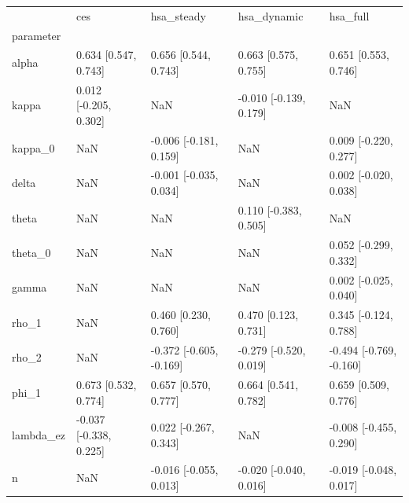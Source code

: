 \begin{tabular}{lllll}
\toprule
 & ces & hsa\_steady & hsa\_dynamic & hsa\_full \\
parameter &  &  &  &  \\
\midrule
alpha & 0.634 [0.547, 0.743] & 0.656 [0.544, 0.743] & 0.663 [0.575, 0.755] & 0.651 [0.553, 0.746] \\
kappa & 0.012 [-0.205, 0.302] & NaN & -0.010 [-0.139, 0.179] & NaN \\
kappa\_0 & NaN & -0.006 [-0.181, 0.159] & NaN & 0.009 [-0.220, 0.277] \\
delta & NaN & -0.001 [-0.035, 0.034] & NaN & 0.002 [-0.020, 0.038] \\
theta & NaN & NaN & 0.110 [-0.383, 0.505] & NaN \\
theta\_0 & NaN & NaN & NaN & 0.052 [-0.299, 0.332] \\
gamma & NaN & NaN & NaN & 0.002 [-0.025, 0.040] \\
rho\_1 & NaN & 0.460 [0.230, 0.760] & 0.470 [0.123, 0.731] & 0.345 [-0.124, 0.788] \\
rho\_2 & NaN & -0.372 [-0.605, -0.169] & -0.279 [-0.520, 0.019] & -0.494 [-0.769, -0.160] \\
phi\_1 & 0.673 [0.532, 0.774] & 0.657 [0.570, 0.777] & 0.664 [0.541, 0.782] & 0.659 [0.509, 0.776] \\
lambda\_ez & -0.037 [-0.338, 0.225] & 0.022 [-0.267, 0.343] & NaN & -0.008 [-0.455, 0.290] \\
n & NaN & -0.016 [-0.055, 0.013] & -0.020 [-0.040, 0.016] & -0.019 [-0.048, 0.017] \\
\bottomrule
\end{tabular}
